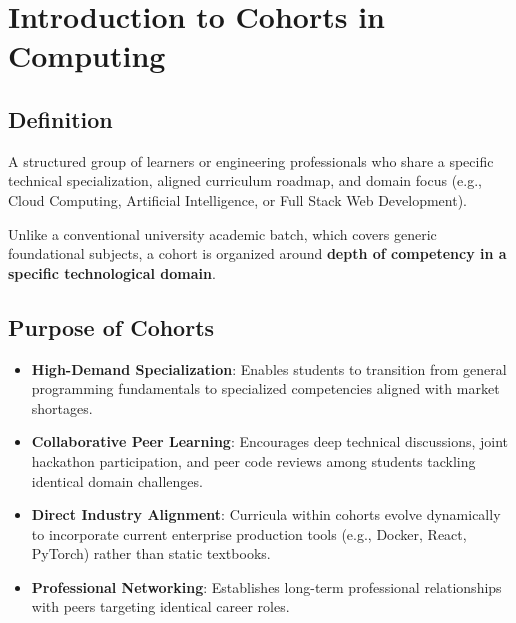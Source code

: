 \section{Introduction to Cohorts in Computing}

\subsection{Definition}

\begin{definition}
A structured group of learners or engineering professionals who share a specific technical specialization, aligned curriculum roadmap, and domain focus (e.g., Cloud Computing, Artificial Intelligence, or Full Stack Web Development).
\end{definition}

Unlike a conventional university academic batch, which covers generic foundational subjects, a cohort is organized around \textbf{depth of competency in a specific technological domain}.

\subsection{Purpose of Cohorts}
\begin{itemize}[leftmargin=1.5em]
    \item \textbf{High-Demand Specialization}: Enables students to transition from general programming fundamentals to specialized competencies aligned with market shortages.
    \item \textbf{Collaborative Peer Learning}: Encourages deep technical discussions, joint hackathon participation, and peer code reviews among students tackling identical domain challenges.
    \item \textbf{Direct Industry Alignment}: Curricula within cohorts evolve dynamically to incorporate current enterprise production tools (e.g., Docker, React, PyTorch) rather than static textbooks.
    \item \textbf{Professional Networking}: Establishes long-term professional relationships with peers targeting identical career roles.
\end{itemize}

